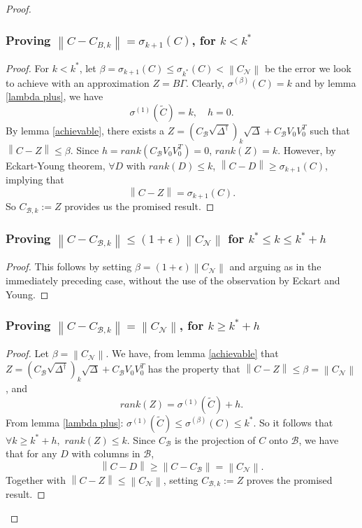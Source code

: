 \documentclass[11pt]{article}
\newcommand{\norm}[1]{\left\|#1\right\|}
\newcommand{\B}{\mathcal{B}}
\newcommand{\N}{\mathcal{N}}
\newcommand{\G}{\Gamma}
\newcommand{\0}{\ensuremath{\mathbf{0}}}
\renewcommand{\>}{\succ}
\newcommand{\<}{\prec}
\begin{document}
\begin{proof}
\subsubsection{Proving $\norm{C - C_{B, k}} = \sigma_{k+1}(C)$, for $k < k^*$}
\begin{proof}
For $k < k^*$, let $\beta = \sigma_{k+1}(C) \leq \sigma_{k^*} (C) < \norm{C_{\N}}$ be the error we look to achieve with an approximation $Z = B \G$. Clearly, $\sigma^{(\beta)} (C) = k$ and by lemma \ref{lambda plus}, we have
\[ \sigma^{(1)}(\tilde{C}) = k, \quad h = 0. \]
By lemma \ref{achievable}, there exists a $Z=(C_{\B} \sqrt{\Delta^{\dagger}})_k \sqrt{\Delta} +C_{\B} V_0V_0^T$ such that $\norm{C - Z} \leq \beta$. Since $h = rank(C_{\B} V_0V_0^T) = 0$, $rank(Z) = k$. However, by Eckart-Young theorem, $\forall D$ with $rank(D) \leq k$, $\norm{C - D} \geq \sigma_{k+1} (C)$, implying that
\[ \norm{C - Z} = \sigma_{k+1}(C).\]
So $C_{\B, k} := Z$ provides us the promised result.
\end{proof}

\subsubsection{Proving $\norm{C - C_{\B, k}} \leq (1 + \epsilon) \norm{C_{\N}}$ for $k^* \leq k \leq k^* + h$}
\begin{proof}
This follows by setting $\beta = (1 + \epsilon)\norm{C_{\N}}$ and arguing as in the immediately preceding case, without the use of the observation by Eckart and Young.
\end{proof}

\subsubsection{Proving $\norm{C- C_{\B, k}} = \norm{C_{\N}}$, for $k \geq k^* + h$}
\begin{proof}
Let $\beta = \norm{C_{\N}}$. We have, from lemma \ref{achievable} that $Z = (C_{\B} \sqrt{\Delta^{\dagger}})_k \sqrt{\Delta} +C_{\B} V_0V_0^T$ has the property that $\norm{C - Z} \leq \beta = \norm{C_{\N}}$, and 
\[ rank(Z) = \sigma^{(1)}(\tilde{C}) + h. \]
From lemma \ref{lambda plus}: $\sigma^{(1)}(\tilde C) \leq \sigma^{(\beta)}(C) \leq k^*$. So it follows that $\forall k \geq k^* + h,$ $rank(Z) \leq k$. Since $C_{\B}$ is the projection of $C$ onto $\B$, we have that for any $D$ with columns in $\B$,
\[ \norm{C - D}  \geq \norm{C - C_{\B}} = \norm{C_{\N}}.\]
Together with $\norm{C - Z}  \leq \norm{C_{\N}}$, setting $C_{\B, k} := Z$ proves the promised result.
\end{proof}


\end{proof}
\end{document}
